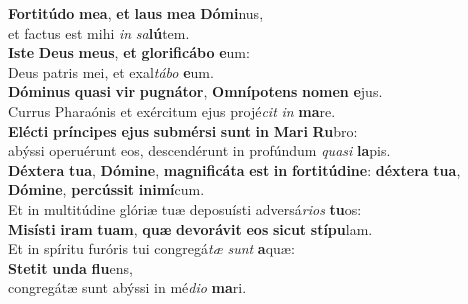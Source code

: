 \evenverse \textbf{For}\textbf{ti}\textbf{tú}\textbf{do} \textbf{me}\textbf{a}, \textbf{et} \textbf{laus} \textbf{me}\textbf{a} \textbf{Dó}\textbf{mi}nus,~\*\\
\evenverse et factus est mihi \textit{in} \textit{sa}\textbf{lú}tem.\\
\oddverse \textbf{I}\textbf{ste} \textbf{De}\textbf{us} \textbf{me}\textbf{us}, \textbf{et} \textbf{glo}\textbf{ri}\textbf{fi}\textbf{cá}\textbf{bo} \textbf{e}um:~\*\\
\oddverse Deus patris mei, et exal\textit{tá}\textit{bo} \textbf{e}um.\\
\evenverse \textbf{Dó}\textbf{mi}\textbf{nus} \textbf{qua}\textbf{si} \textbf{vir} \textbf{pu}\textbf{gná}\textbf{tor}, \textbf{Om}\textbf{ní}\textbf{po}\textbf{tens} \textbf{no}\textbf{men} \textbf{e}jus.~\*\\
\evenverse Currus Pharaónis et exércitum ejus projé\textit{cit} \textit{in} \textbf{ma}re.\\
\oddverse \textbf{E}\textbf{lé}\textbf{cti} \textbf{prín}\textbf{ci}\textbf{pes} \textbf{e}\textbf{jus} \textbf{sub}\textbf{mér}\textbf{si} \textbf{sunt} \textbf{in} \textbf{Ma}\textbf{ri} \textbf{Ru}bro:~\*\\
\oddverse abýssi operuérunt eos, descendérunt in profúndum \textit{qua}\textit{si} \textbf{la}pis.\\
\evenverse \textbf{Déx}\textbf{te}\textbf{ra} \textbf{tu}\textbf{a}, \textbf{Dó}\textbf{mi}\textbf{ne}, \textbf{ma}\textbf{gni}\textbf{fi}\textbf{cá}\textbf{ta} \textbf{est} \textbf{in} \textbf{for}\textbf{ti}\textbf{tú}\textbf{di}\textbf{ne}: \textbf{déx}\textbf{te}\textbf{ra} \textbf{tu}\textbf{a}, \textbf{Dó}\textbf{mi}\textbf{ne}, \textbf{per}\textbf{cús}\textbf{sit} \textbf{i}\textbf{ni}\textbf{mí}cum.~\*\\
\evenverse Et in multitúdine glóriæ tuæ deposuísti adversá\textit{ri}\textit{os} \textbf{tu}os:\\
\oddverse \textbf{Mi}\textbf{sí}\textbf{sti} \textbf{i}\textbf{ram} \textbf{tu}\textbf{am}, \textbf{quæ} \textbf{de}\textbf{vo}\textbf{rá}\textbf{vit} \textbf{e}\textbf{os} \textbf{si}\textbf{cut} \textbf{stí}\textbf{pu}lam.~\*\\
\oddverse Et in spíritu furóris tui congregá\textit{tæ} \textit{sunt} \textbf{a}quæ:\\
\evenverse \textbf{Ste}\textbf{tit} \textbf{un}\textbf{da} \textbf{flu}ens,~\*\\
\evenverse congregátæ sunt abýssi in mé\textit{di}\textit{o} \textbf{ma}ri.\\
